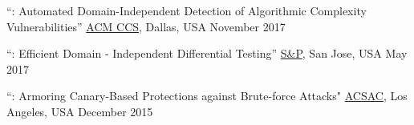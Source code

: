 \vspace{0.025in}

\vspace{0.025in}
\begin{cvhonorswide2}
    \cvhonorwide
    {}
    {``\slowfuzz: Automated Domain-Independent Detection of Algorithmic Complexity Vulnerabilities''}
    {\href{https://ccs2017.sigsac.org/}{ACM CCS}, Dallas, USA}
    {November 2017}
\end{cvhonorswide2}

\vspace{0.025in}
\begin{cvhonorswide2}
    \cvhonorwide
    {}
    {``\nezha: Efficient Domain - Independent Differential Testing''}
    {\href{https://www.ieee-security.org/TC/SP2017/}{S\&P}, San Jose, USA}
    {May 2017}
\end{cvhonorswide2}

\vspace{0.025in}
\begin{cvhonorswide2}
  \cvhonorwide
    {}
    {``\dynaguard: Armoring Canary-Based Protections against Brute-force Attacks"}
    {\href{https://www.acsac.org/2015/}{ACSAC}, Los Angeles, USA}
    {December 2015}

\end{cvhonorswide2}
